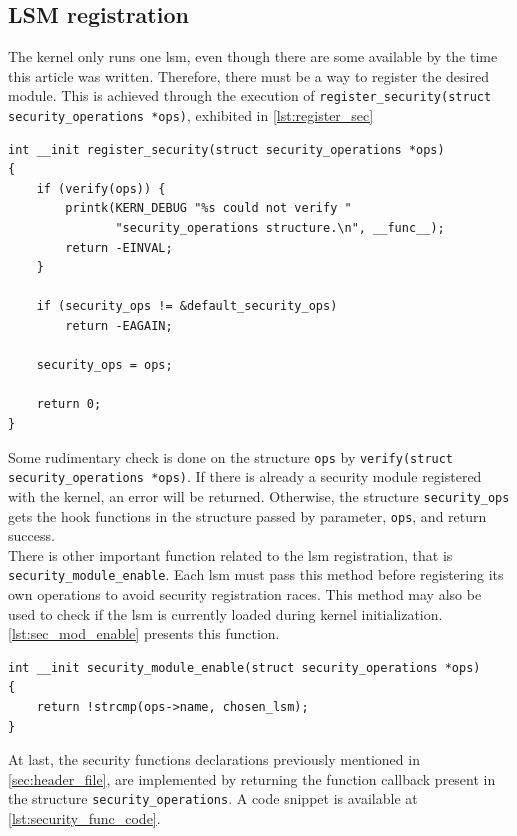 \subsection{LSM registration}
The kernel only runs one \gls{lsm}, even though there are some available by the time this article was written. Therefore, there must be a way to register the desired module. This is achieved through the execution of \texttt{register\_security(struct security\_operations *ops)}, exhibited in \autoref{lst:register_sec}

\begin{lstlisting}[frame=none, numbers=none, caption=\texttt{register\_security} function (Linux kernel v3.11), label=lst:register_sec]
int __init register_security(struct security_operations *ops)
{
	if (verify(ops)) {
		printk(KERN_DEBUG "%s could not verify "
		       "security_operations structure.\n", __func__);
		return -EINVAL;
	}

	if (security_ops != &default_security_ops)
		return -EAGAIN;

	security_ops = ops;

	return 0;
}
\end{lstlisting}

\noindent
Some rudimentary check is done on the structure \texttt{ops} by \texttt{verify(struct security\_operations *ops)}. If there is already a security module registered with the kernel, an error will be returned. Otherwise, the structure \texttt{security\_ops} gets the hook functions in the structure passed by parameter, \texttt{ops}, and return success.\\

\noindent
There is other important function related to the \gls{lsm} registration, that is \texttt{security\_module\_enable}. Each \gls{lsm} must pass this method before registering its own operations to avoid security registration races. This method may also be used to check if the \gls{lsm} is currently loaded during kernel initialization. \autoref{lst:sec_mod_enable} presents this function.

\begin{lstlisting}[frame=none, numbers=none, caption=\texttt{register\_security} function (Linux kernel v3.11), label=lst:sec_mod_enable]
int __init security_module_enable(struct security_operations *ops)
{
	return !strcmp(ops->name, chosen_lsm);
}
\end{lstlisting}

\noindent
At last, the security functions declarations previously mentioned in \autoref{sec:header_file}, are implemented by returning the function callback present in the structure \texttt{security\_operations}. A code snippet is available at \autoref{lst:security_func_code}.

